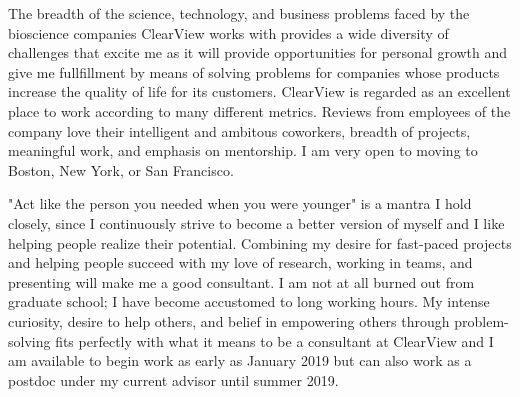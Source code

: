 \documentclass[11pt, letterpaper]{CV_latex_class}
\begin{document}
\begin{cvletter}

\hspace{1em} The breadth of the science, technology, and business problems faced by the bioscience companies ClearView works with provides a wide diversity of challenges that excite me as it will provide opportunities for personal growth and give me fullfillment by means of solving problems for companies whose products increase the quality of life for its customers. ClearView is regarded as an excellent place to work according to many different metrics. Reviews from employees of the company love their intelligent and ambitous coworkers, breadth of projects, meaningful work, and emphasis on mentorship. I am very open to moving to Boston, New York, or San Francisco.



\hspace{1em} "Act like the person you needed when you were younger" is a mantra I hold closely, since I continuously strive to become a better version of myself and I like helping people realize their potential. Combining my desire for fast-paced projects and helping people succeed with my love of research, working in teams, and presenting will make me a good consultant. I am not at all burned out from graduate school; I have become accustomed to long working hours. My intense curiosity, desire to help others, and belief in empowering others through problem-solving fits perfectly with what it means to be a consultant at ClearView and I am available to begin work as early as January 2019 but can also work as a postdoc under my current advisor until summer 2019.

\end{cvletter}


\makeletterclosing

\end{document}
